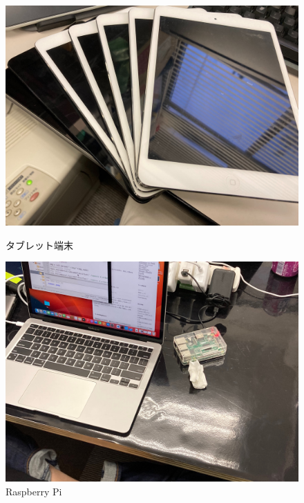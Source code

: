 \begin{figure}[tbh]
  \begin{minipage}[b]{0.45\columnwidth}
    \centering
    \includegraphics[width=\columnwidth]{./image/02-AboutSysken/iPad.jpg}
    \caption{タブレット端末}
  \end{minipage}
  \hspace{0.04\columnwidth}
  \begin{minipage}[b]{0.45\columnwidth}
    \centering
    \includegraphics[width=\columnwidth]{./image/02-AboutSysken/RaspberryPi.jpg}
    \caption{Raspberry Pi}
  \end{minipage}
\end{figure}
